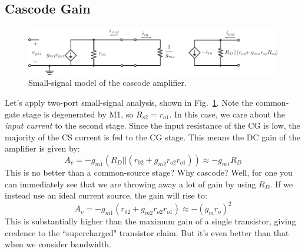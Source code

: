 \subsection{Cascode Gain}
\begin{figure}[tb]
\begin{center}
\includegraphics[scale=1]{11cascode_ss}
\end{center}
\caption{Small-signal model of the cascode amplifier.}
\label{fig:11cascode_ss}
\end{figure}

Let's apply two-port small-signal analysis, shown in Fig.~\ref{fig:11cascode_ss}.  Note the common-gate stage is degenerated by M1, so $R_{s2} = r_{o1}$. In this case, we care about the \textit{input current }to the second stage. Since the input resistance of the CG is low, the majority of the CS current is fed to the CG stage.  This means the DC gain of the amplifier is given by:
 \begin{equation}
	 A_v = -g_{m1} \left(R_D || (r_{02} + g_{m2}r_{o2} r_{o1}) \right) \approx -g_{m1} R_D
\end{equation}
This is no better than a common-source stage?  Why cascode?  Well, for one you can immediately see that we are throwing away a lot of gain by using $R_D$.  If we instead use an ideal current source, the gain will rise to:
 \begin{equation}
	 A_v = -g_{m1}  (r_{02} + g_{m2}r_{o2} r_{o1}) \approx - (g_m r_o)^2 
\end{equation}
This is substantially higher than the maximum gain of a single transistor, giving credence to the ``supercharged" transistor claim.  But it's even better than that when we consider bandwidth. 
